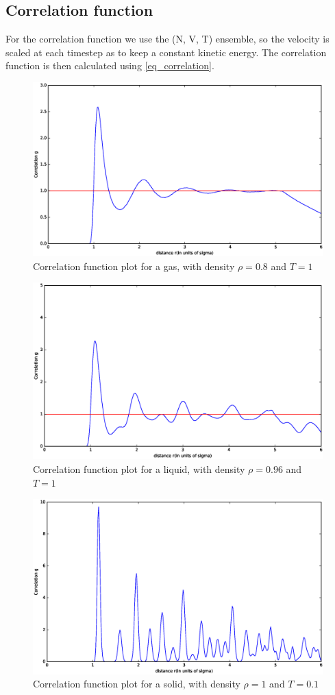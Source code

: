 \documentclass[twoside]{article}
\begin{document}
\subsection{Correlation function}
For the correlation function we use the (N, V, T) ensemble, so the velocity is scaled at each timestep as to keep a constant kinetic energy. The correlation function is then calculated using \eqref{eq_correlation}. 
\begin{figure}
\centering
\includegraphics[width=0.7\linewidth]{fig/figure_corr_gas.eps}
\caption{Correlation function plot for a gas, with density $\rho = 0.8$ and $T = 1$}
\label{fig:figure_corr_gas}
\end{figure}

\begin{figure}
	\centering
	\includegraphics[width=0.7\linewidth]{fig/figure_corr_liquid.eps}
	\caption{Correlation function plot for a liquid, with density $\rho = 0.96$ and $T = 1$}
	\label{fig:figure_corr_liquid}
\end{figure}

\begin{figure}
	\centering
	\includegraphics[width=0.7\linewidth]{fig/figure_corr_solid.eps}
	\caption{Correlation function plot for a solid, with density $\rho = 1$ and $T = 0.1$}
	\label{fig:figure_corr_solid}
\end{figure}
\end{document}
